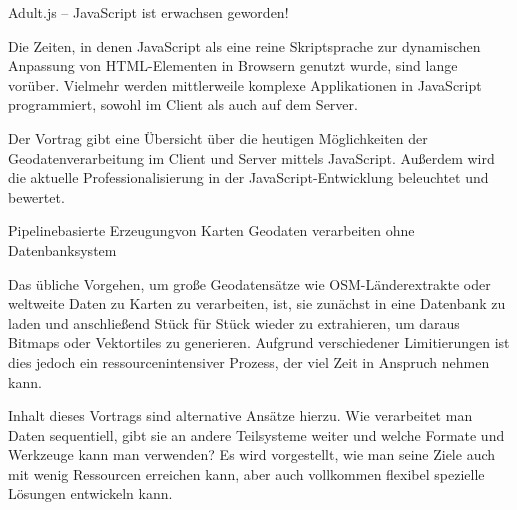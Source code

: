 %
{Adult.js -- JavaScript ist erwachsen geworden!}%
{}%
{%
Die Zeiten, in denen JavaScript als eine reine Skriptsprache zur dynamischen Anpassung von HTML-Elementen
in Browsern genutzt wurde, sind lange vorüber. Vielmehr werden mittlerweile komplexe Applikationen in
Java\-Script programmiert, sowohl im Client als auch auf dem Server.

Der Vortrag gibt eine Übersicht über die heutigen Möglichkeiten der Geodatenverarbeitung im Client
und Server mittels JavaScript. Außerdem wird die aktuelle Professionalisierung in der
JavaScript-Entwicklung beleuchtet und bewertet.%
}

%
{Pipelinebasierte Erzeugung\linebreak von Karten\vspace{0.2em}}%
{Geodaten verarbeiten ohne Datenbanksystem}%
{%
Das übliche Vorgehen, um große Geodatensätze wie OSM-Länderextrakte oder weltweite Daten zu Karten
zu verarbeiten, ist, sie zunächst in eine Datenbank zu laden und anschließend
Stück für Stück wieder zu extrahieren, um daraus Bitmaps oder Vektor\-tiles zu generieren. Aufgrund
verschiedener Limitierungen ist dies jedoch ein ressourcenintensiver Prozess, der viel Zeit in
Anspruch nehmen kann.

Inhalt dieses Vortrags sind alternative Ansätze hierzu. Wie verarbeitet man Daten sequentiell, gibt
sie an andere Teilsysteme weiter und welche Formate und Werkzeuge kann man verwenden?
Es wird vorgestellt, wie man seine
Ziele auch mit wenig Ressourcen erreichen kann, aber auch vollkommen flexibel spezielle Lösungen
entwickeln kann.%
}


